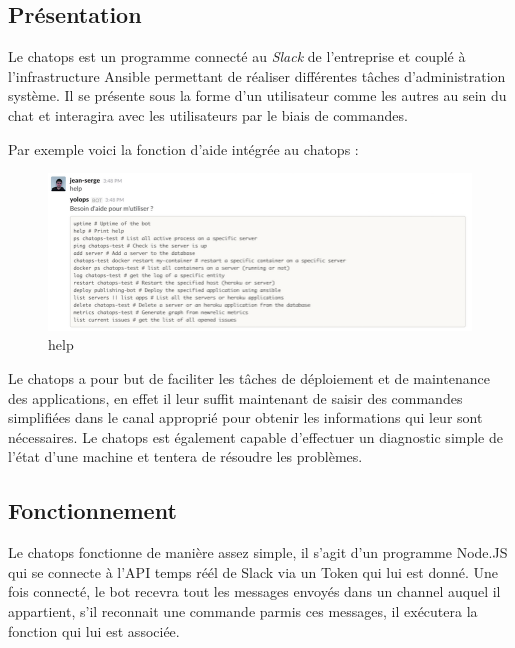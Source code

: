 \documentclass[12pt,a4paper]{article}
\begin{document}
  \bigskip

  \subsection{Présentation}\label{pruxe9sentation-1}

  \bigskip

  Le chatops est un programme connecté au \emph{Slack} de l'entreprise et
  couplé à l'infrastructure Ansible permettant de réaliser différentes
  tâches d'administration système. Il se présente sous la forme d'un
  utilisateur comme les autres au sein du chat et interagira avec les
  utilisateurs par le biais de commandes.

  \bigskip

  Par exemple voici la fonction d'aide intégrée au chatops :

  \begin{figure}[htbp]
  \centering
  \includegraphics{help.png}
  \caption{help}
  \end{figure}

  \bigskip

  Le chatops a pour but de faciliter les tâches de déploiement et de
  maintenance des applications, en effet il leur suffit maintenant de
  saisir des commandes simplifiées dans le canal approprié pour obtenir
  les informations qui leur sont nécessaires. Le chatops est également
  capable d'effectuer un diagnostic simple de l'état d'une machine et
  tentera de résoudre les problèmes.

  \newpage

  \subsection{Fonctionnement}\label{fonctionnement}

  \bigskip

  Le chatops fonctionne de manière assez simple, il s'agit d'un programme
  Node.JS qui se connecte à l'API temps réél de Slack via un Token qui lui
  est donné. Une fois connecté, le bot recevra tout les messages envoyés
  dans un channel auquel il appartient, s'il reconnait une commande parmis
  ces messages, il exécutera la fonction qui lui est associée.
\end{document}
